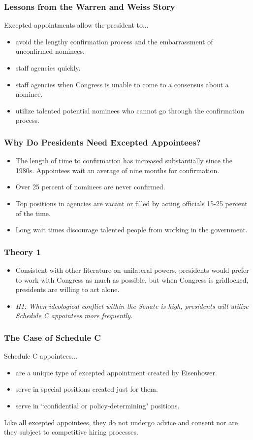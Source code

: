 \documentclass{beamer}
\begin{document}
\begin{frame}
\frametitle{Lessons from the Warren and Weiss Story}
\large
Excepted appointments allow the president to...
\bigskip
\begin{itemize}\addtolength{\itemsep}{0.5\baselineskip}
\item avoid the lengthy confirmation process and the embarrassment of unconfirmed nominees.
\item staff agencies quickly.
\item staff agencies when Congress is unable to come to a consensus about a nominee.
\item utilize talented potential nominees who cannot go through the confirmation process. 
\end{itemize}
\end{frame}

\begin{frame}
\frametitle{Why Do Presidents Need Excepted Appointees?}
\large
\begin{itemize}\addtolength{\itemsep}{0.25\baselineskip}
\item The length of time to confirmation has increased substantially since the 1980s. Appointees wait an average of nine months for confirmation.
\item Over 25 percent of nominees are never confirmed.
\item Top positions in agencies are vacant or filled by acting officials 15-25 percent of the time.
\item Long wait times discourage talented people from working in the government.
\end{itemize}
\end{frame}

\begin{frame}
\frametitle{Theory 1}
\large
\begin{itemize}\addtolength{\itemsep}{1\baselineskip}
\item Consistent with other literature on unilateral powers, presidents would prefer to work with Congress as much as possible, but when Congress is gridlocked, presidents are willing to act alone.
\item \textit{H1: When ideological conflict within the Senate is high, presidents will utilize Schedule C appointees more frequently.}  
\end{itemize}
\end{frame}

\begin{frame}
\frametitle{The Case of Schedule C}
\large
Schedule C appointees...
\begin{itemize}\addtolength{\itemsep}{0.75\baselineskip}
\item are a unique type of excepted appointment created by Eisenhower.
\item serve in special positions created just for them.
\item serve in ``confidential or policy-determining" positions.
\end{itemize}
\bigskip
\bigskip
Like all excepted appointees, they do not undergo advice and consent nor are they subject to competitive hiring processes. 
\end{frame}
\end{document}
